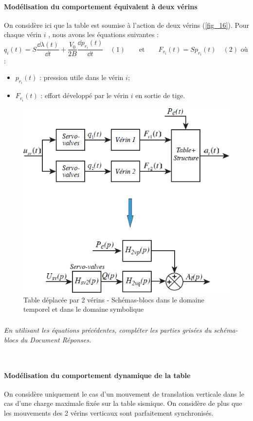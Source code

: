 \documentclass[10pt,fleqn]{article} %
\begin{document}
\paragraph{Modélisation du comportement équivalent à deux vérins}

On considère ici que la table est soumise à l’action de deux vérins (\autoref{fig_16}). Pour chaque vérin $i$ , nous
avons les équations suivantes :
$q_i(t)=S\dfrac{\dd \lambda(t)}{\dd t}+\dfrac{V_0}{2B}\dfrac{\dd p_{r_i}(t)}{\dd t} \quad (1) 
\quad \quad  \text{et} \quad \quad
F_{v_i}(t)=Sp_{r_i}(t) \quad (2) $
où :
\begin{itemize}
\item $p_{r_i} (t)$ : pression utile dans le vérin $i$;
\item $F_{v_i} (t)$ : effort développé par le vérin $i$ en sortie de tige.
\end{itemize}

\begin{figure}[H]
\centering
\includegraphics[width=0.6\linewidth]{fig_16}
\caption{Table déplacée par 2 vérins - Schémas-blocs dans le domaine temporel et dans le
domaine symbolique \label{fig_16}}
\end{figure}

\subparagraph{\label{q_23}}\textit{En utilisant les équations précédentes, compléter les parties grisées du schéma-blocs du Document Réponses.}
\ifprof
\begin{corrige} ~\\

\end{corrige}
\else
\fi

\paragraph{Modélisation du comportement dynamique de la table}
On considère uniquement le cas d’un mouvement de translation verticale dans le cas d’une charge maximale
fixée sur la table sismique. On considère de plus que les mouvements des 2 vérins verticaux sont parfaitement
synchronisés.
\end{document}
